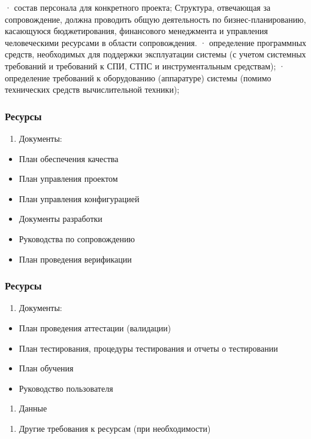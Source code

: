 \documentclass{../industrial-development}
\begin{document}
\lecturenotes
· состав персонала для конкретного проекта;
Структура, отвечающая за сопровождение, должна проводить общую деятельность по бизнес-планированию, касающуюся бюджетирования, финансового менеджмента и управления человеческими ресурсами в области сопровождения. 
· определение программных средств, необходимых для поддержки эксплуатации системы (с учетом системных требований и требований к СПИ, СТПС и инструментальным средствам); 
· определение требований к оборудованию (аппаратуре) системы (помимо технических средств вычислительной техники); 

\begin{frame} \frametitle{Ресурсы}
	\begin{enumerate}[5] \item Документы: \end{enumerate}
	\begin{itemize}
		\item План обеспечения качества
		\item План управления проектом 
		\item План управления конфигурацией 
		\item Документы разработки 
		\item Руководства по сопровождению 
		\item План проведения верификации 
	\end{itemize}
	
\end{frame}

\lecturenotes

\begin{frame} \frametitle{Ресурсы}
	\begin{enumerate}[5] \item Документы: \end{enumerate}
	\begin{itemize} 
		\item План проведения аттестации (валидации) 
		\item План тестирования, процедуры тестирования и отчеты о тестировании 
		\item План обучения 
		\item Руководство пользователя
	\end{itemize}
	\begin{enumerate}[6] \item Данные   \end{enumerate}
	\begin{enumerate}[7] \item Другие требования к ресурсам (при необходимости) \end{enumerate}
	
\end{frame}
\end{document}
